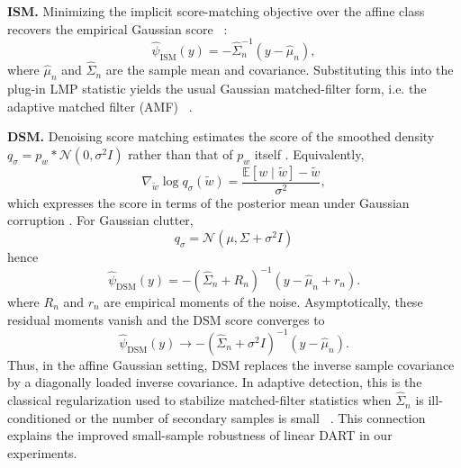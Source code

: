 \noindent\textbf{ISM.}
Minimizing the implicit score-matching objective over the affine class recovers
the empirical Gaussian score ~\cite{hyvarinen2005estimation}:
\begin{equation}
\hat\psi_{\mathrm{ISM}}(y)=-\hat\Sigma_n^{-1}(y-\hat\mu_n),
\end{equation}
where $\hat\mu_n$ and $\hat\Sigma_n$ are the sample mean and covariance.
Substituting this into the plug-in LMP statistic yields the usual Gaussian
matched-filter form, i.e. the adaptive matched filter (AMF) ~\cite{robey1992cfar,kelly1986adaptive}.

\noindent\textbf{DSM.}
Denoising score matching estimates the score of the smoothed density
$
q_\sigma = p_w * \mathcal{N}(0,\sigma^2 I)
$
rather than that of $p_w$ itself \cite{vincent2011connection}. Equivalently,
\begin{equation}
\nabla_{\tilde w}\log q_\sigma(\tilde w)
=
\frac{\mathbb{E}[w\mid \tilde w]-\tilde w}{\sigma^2},
\label{eq:tweedie}
\end{equation}
which expresses the score in terms of the posterior mean under Gaussian
corruption \cite{efron2011tweedie}. For Gaussian clutter,
\begin{equation}
    q_\sigma=\mathcal{N}(\mu,\Sigma+\sigma^2 I)
\end{equation}
hence
\begin{equation}
\hat\psi_{\mathrm{DSM}}(y)
=
-(\hat\Sigma_n+R_n)^{-1}(y-\hat\mu_n+r_n).
\label{eq:gauss_DART_solution0}
\end{equation}
where $R_n$ and $r_n$ are empirical moments of the noise. Asymptotically, these residual moments vanish and the DSM score converges to
\begin{equation}
\hat\psi_{\mathrm{DSM}}(y)
\rightarrow
-(\hat\Sigma_n+\sigma^2 I)^{-1}(y-\hat\mu_n).
\label{eq:gauss_DART_solution}
\end{equation}
Thus, in the affine Gaussian setting, DSM replaces the inverse sample
covariance by a diagonally loaded inverse covariance. In adaptive detection,
this is the classical regularization used to stabilize matched-filter
statistics when $\hat\Sigma_n$ is ill-conditioned or the number of secondary
samples is small ~\cite{carlson1988covariance}. This connection explains the improved
small-sample robustness of linear DART in our experiments.
